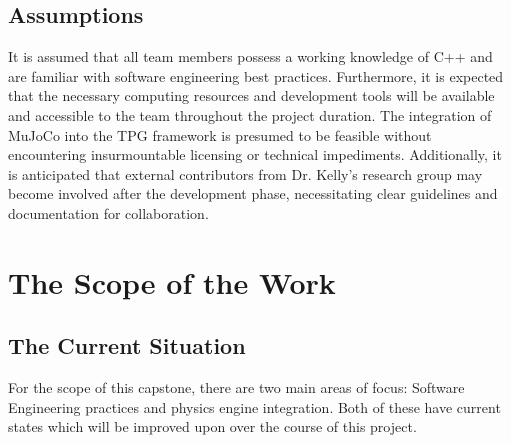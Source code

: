\documentclass[12pt]{article}
\begin{document}
\subsection{Assumptions}
It is assumed that all team members possess a working knowledge of C++ and are familiar with software engineering best practices. Furthermore, it is expected that the necessary computing resources and development tools will be available and accessible to the team throughout the project duration. The integration of MuJoCo into the TPG framework is presumed to be feasible without encountering insurmountable licensing or technical impediments. Additionally, it is anticipated that external contributors from Dr. Kelly's research group may become involved after the development phase, necessitating clear guidelines and documentation for collaboration.

\section{The Scope of the Work}
\subsection{The Current Situation}

For the scope of this capstone, there are two main areas of focus: Software Engineering practices and physics engine integration. Both of these have current states which will be improved upon over the course of this project.
\end{document}
